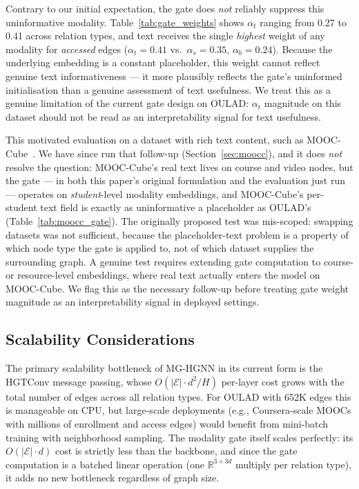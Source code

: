 \documentclass[sigconf,review]{acmart}
\begin{document}
Contrary to our initial expectation, the gate does
\emph{not} reliably suppress this uninformative
modality. Table~\ref{tab:gate_weights} shows
$\alpha_t$ ranging from 0.27 to 0.41 across relation
types, and text receives the single \emph{highest}
weight of any modality for \textit{accessed} edges
($\alpha_t = 0.41$ vs.\ $\alpha_s = 0.35$,
$\alpha_b = 0.24$). Because the underlying embedding
is a constant placeholder, this weight cannot
reflect genuine text informativeness --- it more
plausibly reflects the gate's uninformed
initialisation than a genuine assessment of text
usefulness. We treat this as a genuine limitation of
the current gate design on OULAD: $\alpha_t$
magnitude on this dataset should not be read as an
interpretability signal for text usefulness.

This motivated evaluation on a dataset with rich text
content, such as MOOC-Cube~\citep{yu2020mooccube}. We
have since run that follow-up
(Section~\ref{sec:moocc}), and it does \emph{not}
resolve the question: MOOC-Cube's real text lives on
course and video nodes, but the gate --- in both this
paper's original formulation and the evaluation just
run --- operates on \emph{student}-level modality
embeddings, and MOOC-Cube's per-student text field is
exactly as uninformative a placeholder as OULAD's
(Table~\ref{tab:moocc_gate}). The originally proposed
test was mis-scoped: swapping datasets was not
sufficient, because the placeholder-text problem is a
property of which node type the gate is applied to,
not of which dataset supplies the surrounding graph.
A genuine test requires extending gate computation to
course- or resource-level embeddings, where real text
actually enters the model on MOOC-Cube. We flag this
as the necessary follow-up before treating gate weight
magnitude as an interpretability signal in deployed
settings.

\subsection{Scalability Considerations}
\label{sec:scalability}

The primary scalability bottleneck of MG-HGNN in
its current form is the HGTConv message passing,
whose $O(|\mathcal{E}| \cdot d^2 / H)$ per-layer
cost grows with the total number of edges across
all relation types. For OULAD with 652K edges this
is manageable on CPU, but large-scale deployments
(e.g., Coursera-scale MOOCs with millions of
enrollment and access edges) would benefit from
mini-batch training with neighborhood sampling.
The modality gate itself scales perfectly: its
$O(|\mathcal{E}| \cdot d)$ cost is strictly less
than the backbone, and since the gate computation
is a batched linear operation (one
$\mathbb{R}^{3 \times 3d}$ multiply per relation
type), it adds no new bottleneck regardless of
graph size.
\end{document}

